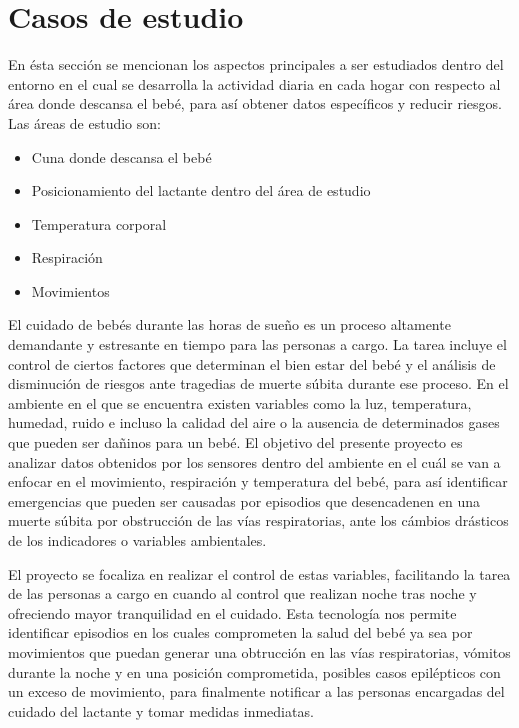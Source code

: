 \documentclass{IEEEtran}
\begin{document}
	\section{Casos de estudio}

		En ésta sección se mencionan los aspectos principales a ser estudiados dentro del entorno en el cual se desarrolla la actividad diaria en cada hogar con respecto al área donde descansa el bebé, para así obtener datos específicos y reducir riesgos. Las áreas de estudio son:

		\begin{itemize}
			\item Cuna donde descansa el bebé
			\item Posicionamiento del lactante dentro del área de estudio
			\item Temperatura corporal
			\item Respiración
			\item Movimientos
		\end{itemize}

		El cuidado de bebés durante las horas de sueño es un proceso altamente demandante y estresante en tiempo para las personas a cargo. La tarea incluye el control de ciertos factores que determinan el bien estar del bebé y el análisis de disminución de riesgos ante tragedias de muerte súbita durante ese proceso. En el ambiente en el que se encuentra existen variables como la luz, temperatura, humedad, ruido e incluso la calidad del aire o la ausencia de determinados gases que pueden ser dañinos para un bebé. El objetivo del presente proyecto es analizar datos obtenidos por los sensores dentro del ambiente en el cuál se van a enfocar en el movimiento, respiración y temperatura del bebé, para así identificar emergencias que pueden ser causadas por episodios que desencadenen en una muerte súbita por obstrucción de las vías respiratorias, ante los cámbios drásticos de los indicadores o variables ambientales.
		
		El proyecto se focaliza en realizar el control de estas variables, facilitando la tarea de las personas a cargo en cuando al control que realizan noche tras noche y ofreciendo mayor tranquilidad en el cuidado. Esta tecnología nos permite identificar episodios en los cuales comprometen la salud del bebé ya sea por movimientos que puedan generar una obtrucción en las vías respiratorias, vómitos durante la noche y en una posición comprometida, posibles casos epilépticos con un exceso de movimiento, para finalmente notificar a las personas encargadas del cuidado del lactante y tomar medidas inmediatas.
\end{document}
